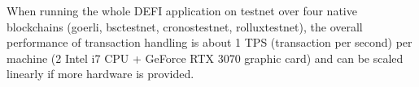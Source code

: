 When running the whole DEFI application on \dprotocol testnet over four native blockchains (goerli, bsctestnet, cronostestnet, rolluxtestnet), the overall performance of transaction handling is about 1 TPS (transaction per second) per machine (2 Intel i7 CPU + GeForce RTX 3070 graphic card) and can be scaled linearly if more hardware is provided.

